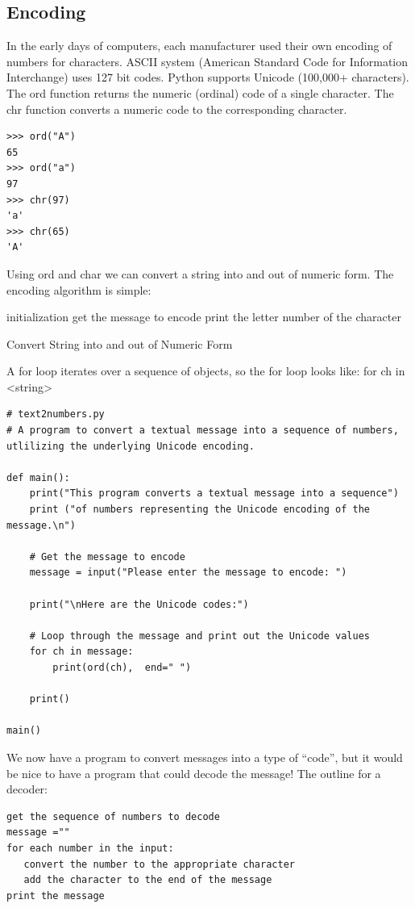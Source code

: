 \documentclass[12pt,a4paper,final,twoside,titlepage]{book}
\begin{document}
\subsection{Encoding}
In the early days of computers, each manufacturer used their own encoding of numbers for characters. ASCII system (American Standard Code for Information Interchange) uses 127 bit codes. Python supports Unicode (100,000+ characters). The ord function returns the numeric (ordinal) code of a single character. The chr function converts a numeric code to the corresponding character.
\begin{lstlisting}
>>> ord("A")
65
>>> ord("a")
97
>>> chr(97)
'a'
>>> chr(65)
'A'
\end{lstlisting}
Using ord and char we can convert a string into and out of numeric form. The encoding algorithm is simple:
\begin{algorithm}[H]
\SetAlgoLined
{}
initialization\;
get the message to encode\;
print the letter number of the character
\caption{Convert String into and out of Numeric Form}
\end{algorithm}

A for loop iterates over a sequence of objects, so the for loop looks like:
for ch in <string>

\begin{lstlisting}
# text2numbers.py
# A program to convert a textual message into a sequence of numbers, utlilizing the underlying Unicode encoding.

def main():
    print("This program converts a textual message into a sequence")
    print ("of numbers representing the Unicode encoding of the message.\n")
    
    # Get the message to encode
    message = input("Please enter the message to encode: ")

    print("\nHere are the Unicode codes:")

    # Loop through the message and print out the Unicode values
    for ch in message:
        print(ord(ch),  end=" ")
        
    print()

main()
\end{lstlisting}

We now have a program to convert messages into a type of “code”, but it would be nice to have a program that could decode the message! The outline for a decoder:
\begin{lstlisting}
get the sequence of numbers to decode
message =""
for each number in the input:
   convert the number to the appropriate character
   add the character to the end of the message
print the message
\end{lstlisting}
\end{document}
